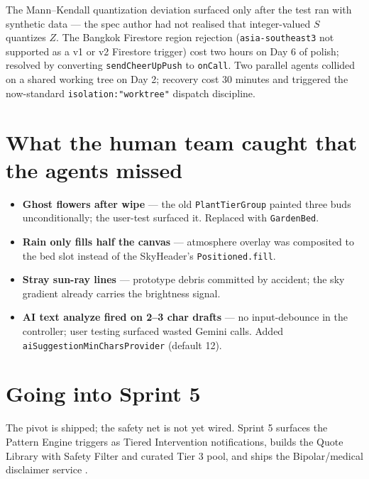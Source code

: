 \documentclass[11pt,a4paper]{article}
\begin{document}
The Mann--Kendall quantization deviation surfaced only after the test ran
with synthetic data --- the spec author had not realised that integer-valued
$S$ quantizes $Z$. The Bangkok Firestore region rejection (\texttt{asia-southeast3} not supported as a v1 or v2 Firestore trigger) cost two hours on Day 6 of polish; resolved by converting \texttt{sendCheerUpPush} to \texttt{onCall}. Two parallel agents collided on a shared working tree on Day 2; recovery cost 30 minutes and triggered the now-standard \texttt{isolation:"worktree"} dispatch discipline.

\section{What the human team caught that the agents missed}

\begin{itemize}[leftmargin=*]
\item \textbf{Ghost flowers after wipe} --- the old \texttt{PlantTierGroup} painted three buds unconditionally; the user-test surfaced it. Replaced with \texttt{GardenBed}.
\item \textbf{Rain only fills half the canvas} --- atmosphere overlay was composited to the bed slot instead of the SkyHeader's \texttt{Positioned.fill}.
\item \textbf{Stray sun-ray lines} --- prototype debris committed by accident; the sky gradient already carries the brightness signal.
\item \textbf{AI text analyze fired on 2--3 char drafts} --- no input-debounce in the controller; user testing surfaced wasted Gemini calls. Added \texttt{aiSuggestionMinCharsProvider} (default 12).
\end{itemize}

\section{Going into Sprint 5}

The pivot is shipped; the safety net is not yet wired. Sprint 5 surfaces
the Pattern Engine triggers as Tiered Intervention notifications,
builds the Quote Library with Safety Filter and curated Tier 3 pool, and
ships the Bipolar/medical disclaimer service \autocite{nahum2018jitai,cheng2019gamification}.

\printbibliography
\end{document}
